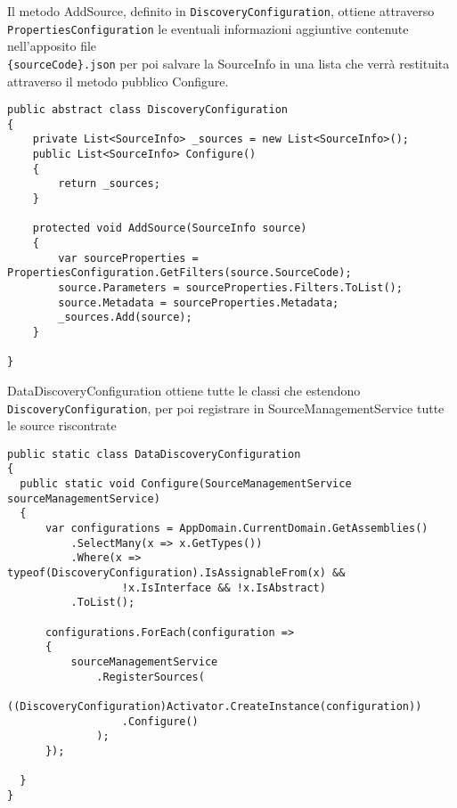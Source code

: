 Il metodo AddSource, definito in \verb|DiscoveryConfiguration|, ottiene attraverso \verb|PropertiesConfiguration| le eventuali informazioni aggiuntive contenute nell’apposito file\\ \verb|{sourceCode}.json| per poi salvare la SourceInfo in una lista che verrà restituita attraverso il metodo pubblico Configure.
\begin{lstlisting}[caption={DiscoveryConfiguration.cs}, style=sharpCode]
public abstract class DiscoveryConfiguration
{
    private List<SourceInfo> _sources = new List<SourceInfo>();
    public List<SourceInfo> Configure()
    {
        return _sources;
    }

    protected void AddSource(SourceInfo source)
    {
        var sourceProperties = PropertiesConfiguration.GetFilters(source.SourceCode);
        source.Parameters = sourceProperties.Filters.ToList();
        source.Metadata = sourceProperties.Metadata;
        _sources.Add(source);
    }

}
\end{lstlisting}
DataDiscoveryConfiguration ottiene tutte le classi che estendono \verb|DiscoveryConfiguration|, per poi registrare in SourceManagementService tutte le source riscontrate
\begin{lstlisting}[caption={DataDiscoveryConfiguraton.cs}, style=sharpCode]
public static class DataDiscoveryConfiguration
{
  public static void Configure(SourceManagementService sourceManagementService)
  {
      var configurations = AppDomain.CurrentDomain.GetAssemblies()
          .SelectMany(x => x.GetTypes())
          .Where(x => typeof(DiscoveryConfiguration).IsAssignableFrom(x) && 
                  !x.IsInterface && !x.IsAbstract)
          .ToList();

      configurations.ForEach(configuration =>
      {
          sourceManagementService
              .RegisterSources(
                  ((DiscoveryConfiguration)Activator.CreateInstance(configuration))
                  .Configure()
              );
      });

  }
}
\end{lstlisting}
